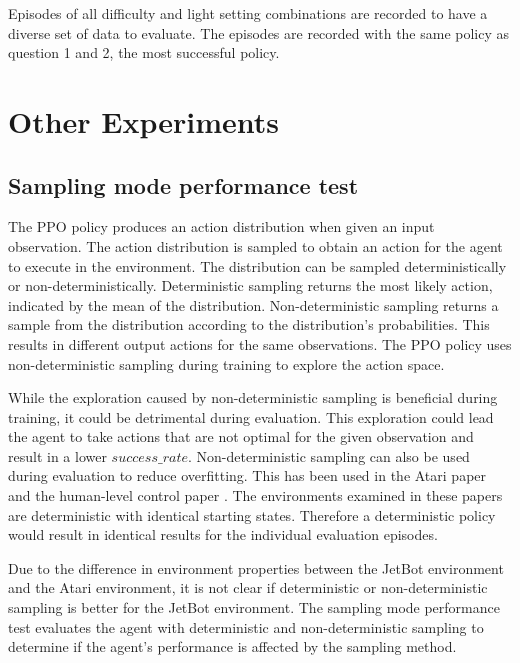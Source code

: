 Episodes of all difficulty and light setting combinations are recorded to have a diverse set of data to evaluate. The episodes are recorded with the same policy as question 1 and 2, the most successful policy.



\section{Other Experiments}

\subsection{Sampling mode performance test}
\label{sec:deterministic_check}

The PPO policy produces an action distribution when given an input observation. The action distribution is sampled to obtain an action for the agent to execute in the environment. The distribution can be sampled deterministically or non-deterministically. Deterministic sampling returns the most likely action, indicated by the mean of the distribution. Non-deterministic sampling returns a sample from the distribution according to the distribution's probabilities. This results in different output actions for the same observations. The PPO policy uses non-deterministic sampling during training to explore the action space.

While the exploration caused by non-deterministic sampling is beneficial during training, it could be detrimental during evaluation. This exploration could lead the agent to take actions that are not optimal for the given observation and result in a lower $success\_rate$. Non-deterministic sampling can also be used during evaluation to reduce overfitting. This has been used in the Atari paper \autocite{atari} and the human-level control paper \autocite{human_level_control}. The environments examined in these papers are deterministic with identical starting states. Therefore a deterministic policy would result in identical results for the individual evaluation episodes.

Due to the difference in environment properties between the JetBot environment and the Atari environment, it is not clear if deterministic or non-deterministic sampling is better for the JetBot environment. The sampling mode performance test evaluates the agent with deterministic and non-deterministic sampling to determine if the agent's performance is affected by the sampling method.


